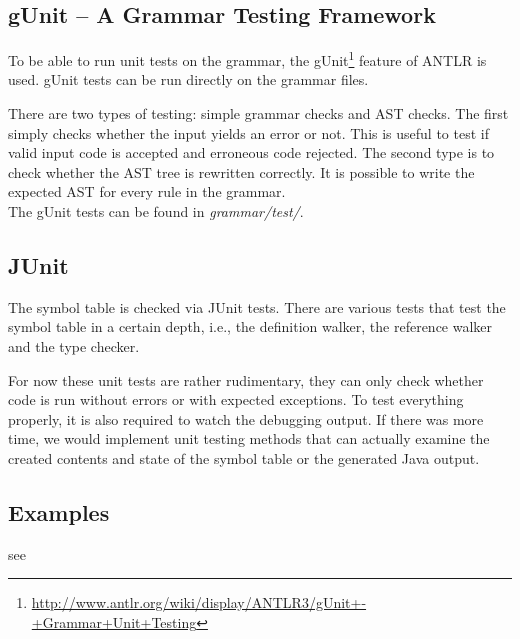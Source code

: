 \subsection{gUnit -- A Grammar Testing Framework}

To be able to run unit tests on the grammar, the gUnit\footnote{
\href{http://www.antlr.org/wiki/display/ANTLR3/gUnit+-+Grammar+Unit+Testing}
{http://www.antlr.org/wiki/display/ANTLR3/gUnit+-+Grammar+Unit+Testing}}
feature of ANTLR is used. gUnit tests can be run directly on the grammar files.

There are two types of testing: simple grammar checks and AST checks. The
first simply checks whether the input yields an error or not. This is useful
to test if valid input code is accepted and erroneous code rejected. The
second type is to check whether the AST tree is rewritten correctly. It is
possible to write the expected AST for every rule in the grammar.\\

The gUnit tests can be found in \emph{grammar/test/}.


\subsection{JUnit}
The symbol table is checked via JUnit tests. There are various tests that
test the symbol table in a certain depth, i.e., the definition walker, the
reference walker and the type checker.

For now these unit tests are rather rudimentary, they can only check whether
code is run without errors or with expected exceptions. To test everything
properly, it is also required to watch the debugging output.
If there was more time, we would implement unit testing methods that can
actually examine the created contents and state of the symbol table or the
generated Java output.


\subsection{Examples}
see 

